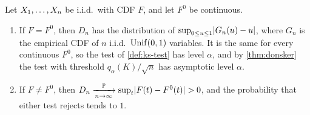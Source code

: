 \begin{theorem}
\label{thm:ks}
Let $X_1, \ldots, X_n$ be i.i.d.\ with CDF $F$, and let $F^0$ be continuous.
\begin{enumerate}[nosep]
\item If $F = F^0$, then $D_n$ has the distribution of $\sup_{0 \leq u \leq 1}\lvert G_n(u) - u\rvert$, where $G_n$ is the empirical CDF of $n$ i.i.d.\ $\mathrm{Unif}(0, 1)$ variables. It is the same for every continuous $F^0$, so the test of \cref{def:ks-test} has level $\alpha$, and by \cref{thm:donsker} the test with threshold $q_\alpha(K)/\sqrt{n}$ has asymptotic level $\alpha$.
\item If $F \neq F^0$, then $D_n \xrightarrow [n \to \infty ]{\mathbb{P}} \sup_t\lvert F(t) - F^0(t)\rvert > 0$, and the probability that either test rejects tends to $1$.
\end{enumerate}
\end{theorem}

